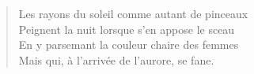 %

\begin{verse}%
  \quatrain%
  Les rayons du soleil comme autant de pinceaux\\  %
  Peignent  la nuit lorsque s’en appose le sceau\\  %
  En y parsemant la couleur chaire des femmes\\  %
  Mais qui, à l’arrivée de l’aurore, se fane.
\end{verse}

